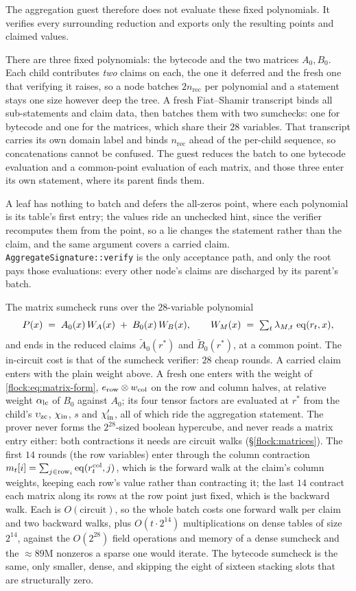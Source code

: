 The aggregation guest therefore does not evaluate these fixed polynomials. It verifies every surrounding reduction and exports only the resulting points and claimed values.

There are three fixed polynomials: the bytecode and the two matrices $A_0,B_0$. Each child contributes \emph{two} claims on each, the one it deferred and the fresh one that verifying it raises, so a node batches $2n_{\mathrm{rec}}$ per polynomial and a statement stays one size however deep the tree. A fresh Fiat--Shamir transcript binds all sub-statements and claim data, then batches them with two sumchecks: one for bytecode and one for the matrices, which share their $28$ variables. That transcript carries its own domain label and binds $n_{\mathrm{rec}}$ ahead of the per-child sequence, so concatenations cannot be confused. The guest reduces the batch to one bytecode evaluation and a common-point evaluation of each matrix, and those three enter its own statement, where its parent finds them.

A leaf has nothing to batch and defers the all-zeros point, where each polynomial is its table's first entry; the values ride an unchecked hint, since the verifier recomputes them from the point, so a lie changes the statement rather than the claim, and the same argument covers a carried claim. \texttt{AggregateSignature::verify} is the only acceptance path, and only the root pays those evaluations: every other node's claims are discharged by its parent's batch.

The matrix sumcheck runs over the $28$-variable polynomial
\[
  P(x) \;=\; A_0(x)\,W_A(x) \;+\; B_0(x)\,W_B(x),
  \qquad
  W_M(x) \;=\; \textstyle\sum_t \lambda_{M,t}\,\operatorname{eq}(r_t,x),
\]
and ends in the reduced claims $\widetilde A_0(r^\ast)$ and $\widetilde B_0(r^\ast)$, at a common point. The in-circuit cost is that of the sumcheck verifier: $28$ cheap rounds. A carried claim enters with the plain weight above. A fresh one enters with the weight of \eqref{flock:eq:matrix-form}, $e_{\mathrm{row}}\otimes w_{\mathrm{col}}$ on the row and column halves, at relative weight $\alpha_{\mathrm{lc}}$ of $B_0$ against $A_0$; its four tensor factors are evaluated at $r^\ast$ from the child's $\upsilon_{\mathrm{zc}}$, $\chi_{\mathrm{in}}$, $s$ and $\chi'_{\mathrm{in}}$, all of which ride the aggregation statement. The prover never forms the $2^{28}$-sized boolean hypercube, and never reads a matrix entry either: both contractions it needs are circuit walks (\S\ref{flock:matrices}). The first $14$ rounds (the row variables) enter through the column contraction $m_t[i]=\sum_{j\in\mathrm{row}_i}\operatorname{eq}(r_t^{\mathrm{col}},j)$, which is the forward walk at the claim's column weights, keeping each row's value rather than contracting it; the last $14$ contract each matrix along its rows at the row point just fixed, which is the backward walk. Each is $O(\text{circuit})$, so the whole batch costs one forward walk per claim and two backward walks, plus $O(t\cdot2^{14})$ multiplications on dense tables of size $2^{14}$, against the $O(2^{28})$ field operations and memory of a dense sumcheck and the $\approx 89\mathrm{M}$ nonzeros a sparse one would iterate. The bytecode sumcheck is the same, only smaller, dense, and skipping the eight of sixteen stacking slots that are structurally zero.

